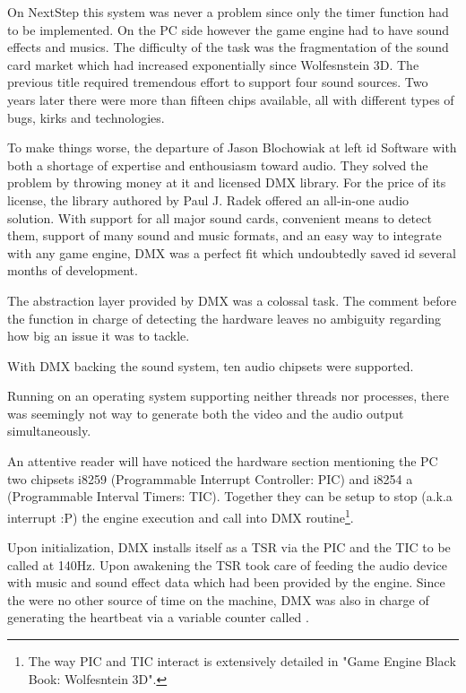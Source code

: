 On NextStep this system was never a problem since only the timer function had to be implemented. On the PC side however the game engine had to have sound effects and musics. The difficulty of the task was the fragmentation of the sound card market which had increased exponentially since Wolfesnstein 3D. The previous title required tremendous effort to support four sound sources. Two years later there were more than fifteen chips available, all with different types of bugs, kirks and technologies.\\
\par
To make things worse, the departure of Jason Blochowiak  at left id Software with both a shortage of expertise and enthousiasm toward audio. They solved the problem by throwing money at it and licensed DMX library. For the price of its license, the library authored by Paul J. Radek offered an all-in-one audio solution. With support for all major sound cards, convenient means to detect them, support of many sound and music formats, and an easy way to integrate with any game engine, DMX was a perfect fit which undoubtedly saved id several months of development.\\
\par
The abstraction layer provided by DMX was a colossal task. The comment before the function in charge of detecting the hardware leaves no ambiguity regarding how big an issue it was to tackle.\\
\par
{}
\par
With DMX backing the sound system, ten audio chipsets were supported.\\
\par
{}
\par
Running on an operating system supporting neither threads nor processes, there was seemingly not way to generate both the video and the audio output simultaneously.\\
\par
 An attentive reader will have noticed the hardware section mentioning the PC two chipsets i8259 (Programmable Interrupt Controller: PIC) and i8254 a (Programmable Interval Timers: TIC). Together they can be setup to stop (a.k.a interrupt :P) the engine execution and call into DMX routine\footnote{The way PIC and TIC interact is extensively detailed in "Game Engine Black Book: Wolfesntein 3D".}.\\
\par
Upon initialization, DMX installs itself as a TSR via the PIC and the TIC to be called at 140Hz. Upon awakening the TSR took care of feeding the audio device with music and sound effect data which had been provided by the engine. Since the were no other source of time on the machine, DMX was also in charge of generating the heartbeat via a variable counter called .
\par


